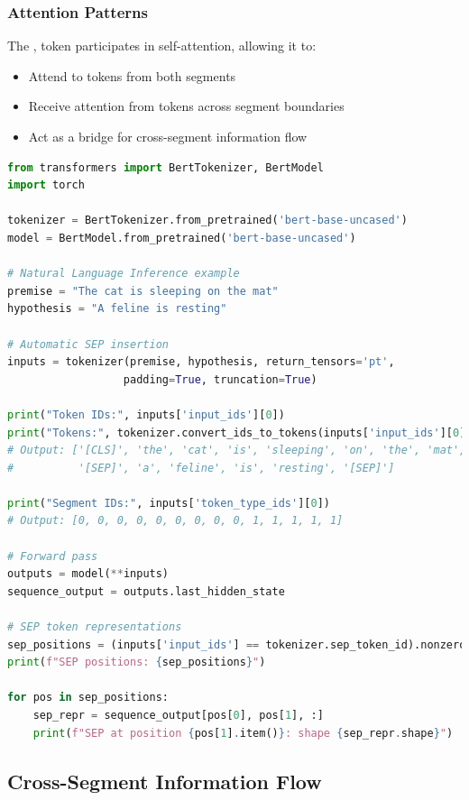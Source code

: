 \subsubsection{Attention Patterns}
The \sep{} token participates in self-attention, allowing it to:
\begin{itemize}
\item Attend to tokens from both segments
\item Receive attention from tokens across segment boundaries
\item Act as a bridge for cross-segment information flow
\end{itemize}

\begin{lstlisting}[language=Python, caption=SEP Token Usage]
from transformers import BertTokenizer, BertModel
import torch

tokenizer = BertTokenizer.from_pretrained('bert-base-uncased')
model = BertModel.from_pretrained('bert-base-uncased')

# Natural Language Inference example
premise = "The cat is sleeping on the mat"
hypothesis = "A feline is resting"

# Automatic SEP insertion
inputs = tokenizer(premise, hypothesis, return_tensors='pt', 
                  padding=True, truncation=True)

print("Token IDs:", inputs['input_ids'][0])
print("Tokens:", tokenizer.convert_ids_to_tokens(inputs['input_ids'][0]))
# Output: ['[CLS]', 'the', 'cat', 'is', 'sleeping', 'on', 'the', 'mat', 
#          '[SEP]', 'a', 'feline', 'is', 'resting', '[SEP]']

print("Segment IDs:", inputs['token_type_ids'][0])
# Output: [0, 0, 0, 0, 0, 0, 0, 0, 0, 1, 1, 1, 1, 1]

# Forward pass
outputs = model(**inputs)
sequence_output = outputs.last_hidden_state

# SEP token representations
sep_positions = (inputs['input_ids'] == tokenizer.sep_token_id).nonzero()
print(f"SEP positions: {sep_positions}")

for pos in sep_positions:
    sep_repr = sequence_output[pos[0], pos[1], :]
    print(f"SEP at position {pos[1].item()}: shape {sep_repr.shape}")
\end{lstlisting}

\subsection{Cross-Segment Information Flow}

